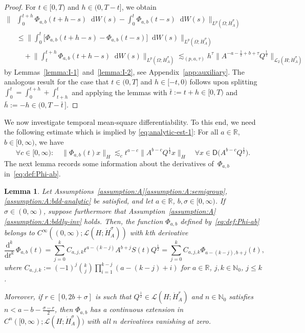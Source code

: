 \documentclass[reqno]{amsart}
\numberwithin{equation}{section}
\newcommand{\bbN}{\mathbb{N}}
\newcommand{\bbR}{\mathbb{R}}
\newcommand{\R}{\mathbb{R}}
\newcommand{\N}{\mathbb{N}}
\newcommand{\norm}[2]{     \| #1       \|_{ #2 }}
\newcommand{\rd}{\mathop{}\!\mathrm{d}}
\newcommand{\Hdot}[1]{\dot{H}^{#1}_A}
\newtheorem{lemma}{Lemma}[section]
\theoremstyle{remark}
\theoremstyle{definition}
\begin{document}
\begin{proof}
	For $t \in [0,T)$ and $h \in (0,T-t]$, we 
	obtain
	\begin{align*}
	\biggl\| 
	&\int_0^{t+h} \Phi_{a,b}(t+h -s) \rd W(s) - \int_0^t \Phi_{a,b}(t-s)\rd W(s) 
	\biggr\|_{L^p(\Omega; \Hdot \sigma)} 
	\\
	&\leq  
	\biggl\| \int_0^t \bigl[ \Phi_{a,b}(t+h-s) - \Phi_{a,b}(t-s) \bigr] \rd W(s) 
	\biggr\|_{L^p(\Omega;\Hdot \sigma)} 
	\\
	&\quad + 
	\biggl\| \int_t^{t+h} \Phi_{a,b}(t+h-s) \rd W(s) \biggr\|_{L^p(\Omega; \Hdot \sigma)} 
	\lesssim_{(p,a,\tau)} 
	h^\tau 
	\bigl\| A^{-a-\frac{1}{2} +b+\tau} Q^{\frac{1}{2}} \bigr\|_{\mathscr L_2(H;\Hdot \sigma)} 
	\end{align*}
	by Lemmas~\ref{lemma:I-1}~and~\ref{lemma:I-2}, 
	see Appendix~\ref{app:auxiliary}. 
	The analogous result for the case that 
	$t\in(0,T]$ and $h\in[-t,0)$  
	follows upon splitting 
	$\int_0^t = \int_0^{t+h} + \int_{t+h}^t$ 
	and applying the lemmas with 
	$\bar t := t+h \in [0,T)$ and 
	$\bar h := -h \in (0,T-\bar t\,]$.
\end{proof}

We now investigate temporal mean-square differentiability. 
To this end, we need the following estimate which 
is implied by \eqref{eq:analytic-est-1}: 
For all $a\in\R$, $b\in[0,\infty)$, we have  
%
\begin{equation}\label{eq:analytic-est-Phi} 
\forall c \in [0,\infty): 
\quad 
\norm{\Phi_{a,b}(t)x}{H}
\lesssim_{c} 
t^{a-c} 
\bigl\| A^{b-c} Q^{\frac{1}{2}} x \bigr\|_{H}
\quad 
\forall x\in \mathsf D\bigl( A^{b-c} Q^{\frac{1}{2}} \bigr). 
\end{equation}
% 
The next lemma records some information 
about the derivatives of~$\Phi_{a,b}$ in~\eqref{eq:def:Phi-ab}. 


\begin{lemma}\label{lem:diffbty-of-Phi}
	Let Assumptions~\textup{\ref{assumption:A}\ref{assumption:A:semigroup},\ref{assumption:A:bdd-analytic}} 
	be satisfied, 
	and let $a\in\R$, $b,\sigma\in [0,\infty)$.
	If $\sigma\in(0,\infty)$, 
	suppose furthermore that 
	Assumption~\textup{\ref{assumption:A}\ref{assumption:A:bddly-inv}} holds.
	Then, 
	the function $\Phi_{a,b}$ 
	defined by~\eqref{eq:def:Phi-ab}
	belongs 
	to $C^\infty((0,\infty); \mathscr L(H; \dot H_A^\sigma))$  
	with $k$th derivative 
	\begin{equation}\label{eq:deriv-operator-suggestive} 
	\frac{\mathrm d^k}{\mathrm d t^k} \, 
	\Phi_{a,b} (t)
	= 
	\sum_{j=0}^k C_{a,j,k} t^{a -(k-j)} A^{b+j} S(t)Q^\frac{1}{2} 
	= 
	\sum_{j=0}^k C_{a,j,k} \Phi_{a-(k-j),b+j}(t),  
	\end{equation} 
	where 
	$C_{a,j,k} := 
	(-1)^j \binom{k}{j} \prod_{i=1}^{k-j} (a-(k-j)+i)$ 
	for $a\in\bbR$, $j,k\in\bbN_0$, $j\leq k$. 
	
	Moreover, if $r\in[0, 2b+\sigma ]$ is such that 
	$Q^{\frac{1}{2}} \in \mathscr L(H;\dot H_A^r)$ and 
	$n\in\N_0$ satisfies $n < a - b - \tfrac{\sigma-r}{2}$, 
	then $\Phi_{a,b}$ has 
	a continuous extension in 
	$C^n( [0,\infty); \mathscr L(H;\Hdot\sigma))$
	with all $n$ derivatives vanishing at zero.
\end{lemma}
\end{document}
